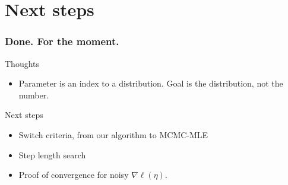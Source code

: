 \documentclass[slidestop,compress, 10pt]{beamer}
\begin{document}
\section{Next steps}
\frame
{
\frametitle{Done.  For the moment.}
Thoughts
\begin{itemize}
	\item Parameter is an index to a distribution.  Goal is the distribution, not the number.
\end{itemize}


Next steps
\begin{itemize}
	\item Switch criteria, from our algorithm to MCMC-MLE
	\item Step length search
	\item Proof of convergence for noisy $\nabla \ell( \eta)$.
\end{itemize}
}



\appendix
{}
\setcounter{finalframe}{\value{framenumber}}
\end{document}
